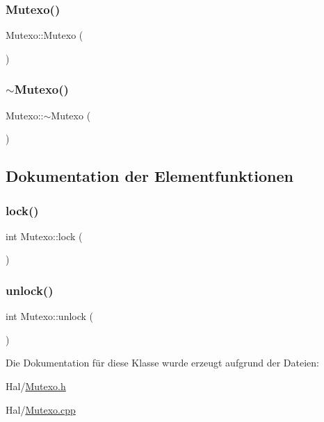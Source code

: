 \subsubsection{\texorpdfstring{Mutexo()}{Mutexo()}}
{\footnotesize\ttfamily Mutexo\+::\+Mutexo (\begin{DoxyParamCaption}{ }\end{DoxyParamCaption})}

\hypertarget{class_mutexo_af8942ad328e7c91931f63e6a243081d1}{}\label{class_mutexo_af8942ad328e7c91931f63e6a243081d1} 
\subsubsection{\texorpdfstring{$\sim$\+Mutexo()}{~Mutexo()}}
{\footnotesize\ttfamily Mutexo\+::$\sim$\+Mutexo (\begin{DoxyParamCaption}{ }\end{DoxyParamCaption})\hspace{0.3cm}{\ttfamily [virtual]}}



\subsection{Dokumentation der Elementfunktionen}
\hypertarget{class_mutexo_a22aac64070af68adc9acc1fef3d3f4aa}{}\label{class_mutexo_a22aac64070af68adc9acc1fef3d3f4aa} 
\subsubsection{\texorpdfstring{lock()}{lock()}}
{\footnotesize\ttfamily int Mutexo\+::lock (\begin{DoxyParamCaption}{ }\end{DoxyParamCaption})}

\hypertarget{class_mutexo_a9f51083616ed99edc2add313f840016c}{}\label{class_mutexo_a9f51083616ed99edc2add313f840016c} 
\subsubsection{\texorpdfstring{unlock()}{unlock()}}
{\footnotesize\ttfamily int Mutexo\+::unlock (\begin{DoxyParamCaption}{ }\end{DoxyParamCaption})}



Die Dokumentation für diese Klasse wurde erzeugt aufgrund der Dateien\+:\begin{DoxyCompactItemize}
\item 
Hal/\hyperlink{_mutexo_8h}{Mutexo.\+h}\item 
Hal/\hyperlink{_mutexo_8cpp}{Mutexo.\+cpp}\end{DoxyCompactItemize}
